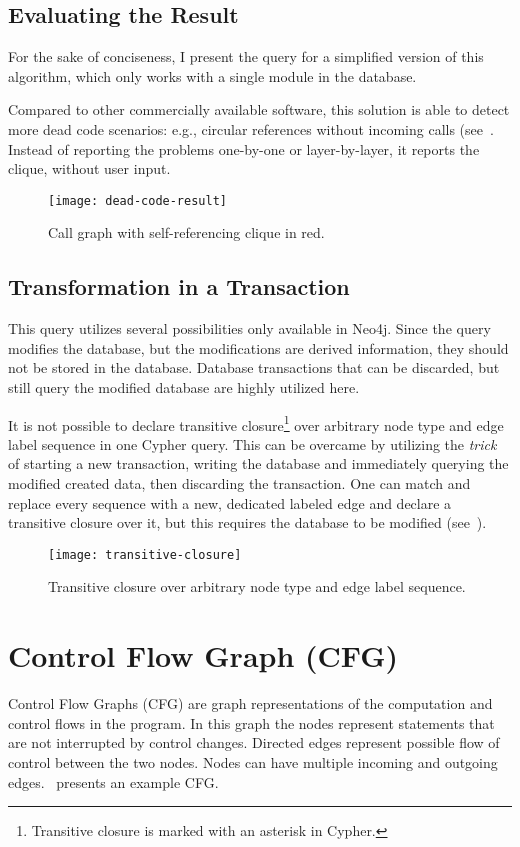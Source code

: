 \subsection{Evaluating the Result}
For the sake of conciseness, I present the query for a simplified version of this algorithm, which only works with a single module in the database.

Compared to other commercially available software, this solution is able to detect more dead code scenarios: e.g., circular references without incoming calls (see~. Instead of reporting the problems one-by-one or layer-by-layer, it reports the clique, without user input.

\begin{figure}[htbp]
  \centering
  \texttt{[image: dead-code-result]}
  \caption{Call graph with self-referencing clique in red.}
  \label{fig:dead-code-result}
\end{figure}

\subsection{Transformation in a Transaction}
This query utilizes several possibilities only available in Neo4j. Since the query modifies the database, but the modifications are derived information, they should not be stored in the database. Database transactions that can be discarded, but still query the modified database are highly utilized here.

It is not possible to declare transitive closure\footnote{Transitive closure is marked with an asterisk in Cypher.} over arbitrary node type and edge label sequence in one Cypher query. This can be overcame by utilizing the \emph{trick} of starting a new transaction, writing the database and immediately querying the modified created data, then discarding the transaction. One can match and replace every sequence with a new, dedicated labeled edge and declare a transitive closure over it, but this requires the database to be modified (see~).

\begin{figure}[htbp]
  \centering
  \texttt{[image: transitive-closure]}
  \caption{Transitive closure over arbitrary node type and edge label sequence.}
  \label{fig:transitive-closure}
\end{figure}


\section{Control Flow Graph (CFG)}
Control Flow Graphs (CFG) are graph representations of the computation and control flows in the program. In this graph the nodes represent statements that are not interrupted by control changes. Directed edges represent possible flow of control between the two nodes. Nodes can have multiple incoming and outgoing edges.~\cite{IntroductionToCompilers}
 presents an example CFG.

